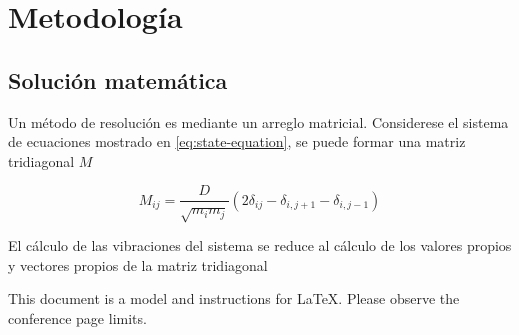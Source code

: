 \section{Metodología}
\subsection{Solución matemática}

Un método de resolución es mediante un arreglo matricial. Considerese el sistema de ecuaciones mostrado en \ref{eq:state-equation}, se puede formar una matriz tridiagonal $M$


\begin{equation*}
	M_{ij} = \frac{D}{\sqrt{m_i m_j}} (2 \delta_{ij} - \delta_{i, j+1} - \delta_{i, j-1}) 
\end{equation*}


El cálculo de las vibraciones del sistema se reduce al cálculo de los valores propios y vectores propios de la matriz tridiagonal

This document is a model and instructions for \LaTeX.
Please observe the conference page limits. 